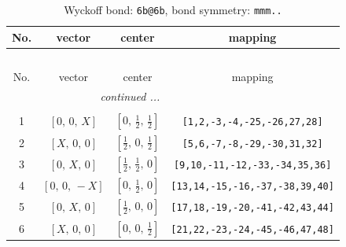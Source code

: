 \documentclass[fleqn,8pt]{jsarticle}
\begin{document}
\renewcommand{\arraystretch}{1.2}
\begin{longtable}{cccc}
\caption{Wyckoff bond: {\tt 6b@6b}, bond symmetry: {\tt mmm..}}
 \\
 \hline \hline
No. & vector & center & mapping \\ \hline \endfirsthead

\multicolumn{3}{l}{\tablename\ \thetable{}} \\
 \hline \hline
No. & vector & center & mapping \\ \hline \endhead

 \hline \hline
\multicolumn{3}{r}{\footnotesize\it continued ...} \\ \endfoot

 \hline \hline
\multicolumn{3}{r}{} \\ \endlastfoot

1 & $\left[ 0,\, 0,\, X \right]$ & $\left[ 0,\, \frac{1}{2},\, \frac{1}{2} \right]$ & {\tt [1,2,-3,-4,-25,-26,27,28]} \\ \hline
2 & $\left[ X,\, 0,\, 0 \right]$ & $\left[ \frac{1}{2},\, 0,\, \frac{1}{2} \right]$ & {\tt [5,6,-7,-8,-29,-30,31,32]} \\ \hline
3 & $\left[ 0,\, X,\, 0 \right]$ & $\left[ \frac{1}{2},\, \frac{1}{2},\, 0 \right]$ & {\tt [9,10,-11,-12,-33,-34,35,36]} \\ \hline
4 & $\left[ 0,\, 0,\, - X \right]$ & $\left[ 0,\, \frac{1}{2},\, 0 \right]$ & {\tt [13,14,-15,-16,-37,-38,39,40]} \\ \hline
5 & $\left[ 0,\, X,\, 0 \right]$ & $\left[ \frac{1}{2},\, 0,\, 0 \right]$ & {\tt [17,18,-19,-20,-41,-42,43,44]} \\ \hline
6 & $\left[ X,\, 0,\, 0 \right]$ & $\left[ 0,\, 0,\, \frac{1}{2} \right]$ & {\tt [21,22,-23,-24,-45,-46,47,48]} \\
\end{longtable}
\renewcommand{\arraystretch}{1.2}
\end{document}
